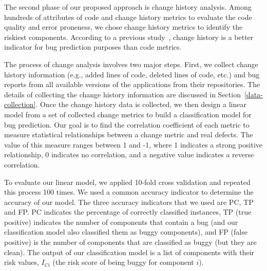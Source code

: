 The second phase of our proposed approach is change history analysis.
Among hundreds of attributes of code and change history metrics to evaluate
the code quality and error proneness, we chose change history metrics to identify
the riskiest components. According to a previous study~\cite{raimund},
change history is a better indicator for bug prediction purposes than code metrics.
 

The process of change analysis involves two major steps. 
First, we collect change history information (e.g., added lines of code,
deleted lines of code, etc.) and bug reports
from all available versions of the
applications from their repositories.  
The details of collecting the change history information 
are discussed in Section~\ref{data-collection}.  
Once the change history data is collected, 
we then design a linear model from a set of collected 
change metrics to build a classification model for bug prediction.
Our goal is to find the correlation coefficient of each 
metric to measure statistical relationships between a change metric and 
real defects. 
The value of this measure 
ranges between 1 and -1, where 1 indicates a strong 
positive relationship, 0 indicates no correlation, and a
negative value indicates a reverse correlation.

To evaluate our linear model, we applied 10-fold cross validation
and repeated this process 100 times. 
We used a common accuracy indicator to determine the accuracy of 
our model. 
The three accuracy indicators that we used are PC, TP and FP. 
PC indicates the percentage of correctly classified 
instances,
TP (true positive) indicates the number of components
that contain a bug (and our classification
model also classified them as buggy components), 
and FP (false positive) is the number of components that 
are classified as buggy (but they are clean). 
The output of our classification model is a list of components with
their risk values, $I_{Ci}$ (the risk score of being buggy for component $i$).

